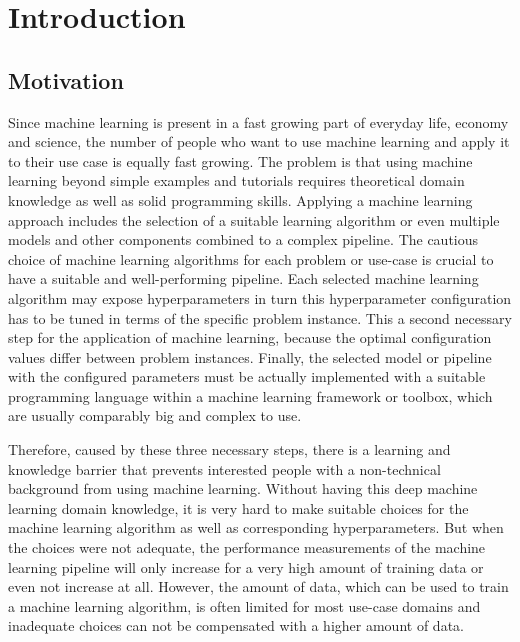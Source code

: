 %
\chapter{Introduction}
\label{sec:intro}

\section{Motivation}
\label{sec:intro:motivation}

Since machine learning is present in a fast growing part of everyday life, economy and science, the number of people who want to use machine learning and apply it to their use case is equally fast growing.
The problem is that using machine learning beyond simple examples and tutorials requires theoretical domain knowledge as well as solid programming skills.\newline
Applying a machine learning approach includes the selection of a suitable learning algorithm or even multiple models and other components combined to a complex pipeline.
The cautious choice of machine learning algorithms for each problem or use-case is crucial to have a suitable and well-performing pipeline.\newline
Each selected machine learning algorithm may expose hyperparameters in turn this hyperparameter configuration has to be tuned in terms of the specific problem instance.
This a second necessary step for the application of machine learning, because the optimal configuration values differ between problem instances.\newline
Finally, the selected model or pipeline with the configured parameters must be actually implemented with a suitable programming language within a machine learning framework or toolbox, which are usually comparably big and complex to use.

Therefore, caused by these three necessary steps, there is a learning and knowledge barrier that prevents interested people with a non-technical background from using machine learning.
Without having this deep machine learning domain knowledge, it is very hard to make suitable choices for the machine learning algorithm as well as corresponding hyperparameters.\newline
But when the choices were not adequate, the performance measurements of the machine learning pipeline will only increase for a very high amount of training data or even not increase at all.
However, the amount of data, which can be used to train a machine learning algorithm, is often limited for most use-case domains and inadequate choices can not be compensated with a higher amount of data.

